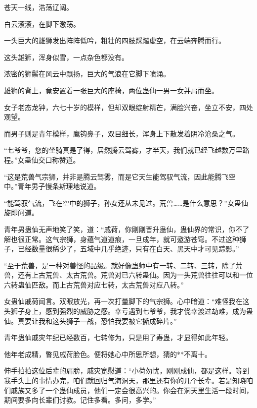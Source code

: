 
\begin{this_body}

苍天一线，浩荡辽阔。

白云滚滚，在脚下激荡。

一头巨大的雄狮发出阵阵低吟，粗壮的四肢踩踏虚空，在云端奔腾而行。

这头雄狮，浑身似雪，一点杂色都没有。

浓密的狮鬃在风云中飘扬，巨大的气浪在它脚下喷涌。

雄狮的背上，竟安置着一张巨大的座椅，两位蛊仙一男一女并肩而坐。

女子老态龙钟，六七十岁的模样，但却双眼绽射精芒，满脸兴奋，坐立不安，四处观望。

而男子则是青年模样，鹰钩鼻子，双目细长，浑身上下散发着阴冷沧桑之气。

“七爷爷，您的坐骑真是了得，居然腾云驾雾，才半天，我们就已经飞越数万里路程。”女蛊仙交口称赞道。

“这是荒兽气宗狮，并非是腾云驾雾，而是它天生能驾驭气流，因此能腾飞空中。”青年男子慢条斯理地说道。

“能驾驭气流，飞在空中的狮子，孙女还从未见过。荒兽……是什么意思？”女蛊仙旋即问道。

青年男蛊仙无声地笑了笑，道：“戚荷，你刚刚晋升蛊仙，蛊仙界的常识，你不了解也很正常。这气宗狮，身蕴气道道痕，一旦成年，就可遨游苍穹。不过这种狮子，已经数量很稀少了，五域中几乎绝迹，只有在白天、黑天中才可见踪影。”

“至于荒兽，是一种对兽怪的品级。就好像蛊师中有一转、二转、三转，除了荒兽，还有上古荒兽、太古荒兽。荒兽对已六转蛊仙。因为一头荒兽往往可以和一位六转蛊仙匹敌。而上古荒兽对应七转，太古荒兽对应八转。”

女蛊仙戚荷闻言。双眼放光，再一次打量脚下的气宗狮。心中暗道：“难怪我在这头狮子身上，感到强烈的威胁之感。幸亏遇到七爷爷，我才侥幸渡过劫难，成为蛊仙。真要让我和这头狮子一战，恐怕我要被它撕成碎片。”

青年蛊仙戚灾年纪已经数百，七转修为，只是用了寿蛊，才显得如此年轻。

他年老成精，瞥见戚荷脸色。便将她心中所思所想，猜的**不离十。

伸手拍拍这位后辈的肩膀，戚灾宽慰道：“小荷勿忧，刚刚成仙，都是这样。等到我手头上的事情办完，咱们就回归气海洞天，那里还有你的几个长辈。若是知晓咱们戚族又多了一个蛊仙成员，他们一定会很高兴的。你会在洞天里生活一段时间，期间要多向长辈们讨教。记住多看。多问，多学。”


\end{this_body}

